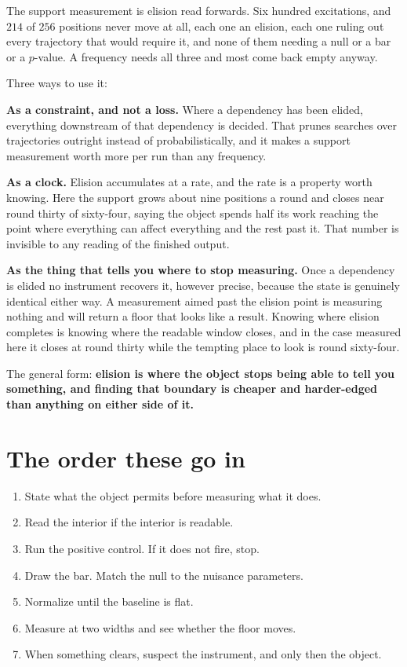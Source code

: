 The support measurement is elision read forwards. Six hundred excitations, and \(214\) of \(256\) positions never move at all, each one an elision, each one ruling out every trajectory that would require it, and none of them needing a null or a bar or a \(p\)-value. A frequency needs all three and most come back empty anyway.

Three ways to use it:

\textbf{As a constraint, and not a loss.} Where a dependency has been elided, everything downstream of that dependency is decided. That prunes searches over trajectories outright instead of probabilistically, and it makes a support measurement worth more per run than any frequency.

\textbf{As a clock.} Elision accumulates at a rate, and the rate is a property worth knowing. Here the support grows about nine positions a round and closes near round thirty of sixty-four, saying the object spends half its work reaching the point where everything can affect everything and the rest past it. That number is invisible to any reading of the finished output.

\textbf{As the thing that tells you where to stop measuring.} Once a dependency is elided no instrument recovers it, however precise, because the state is genuinely identical either way. A measurement aimed past the elision point is measuring nothing and will return a floor that looks like a result. Knowing where elision completes is knowing where the readable window closes, and in the case measured here it closes at round thirty while the tempting place to look is round sixty-four.

The general form: \textbf{elision is where the object stops being able to tell you something, and finding that boundary is cheaper and harder-edged than anything on either side of it.}

\section{The order these go in}

\begin{enumerate}
  \item State what the object permits before measuring what it does.
  \item Read the interior if the interior is readable.
  \item Run the positive control. If it does not fire, stop.
  \item Draw the bar. Match the null to the nuisance parameters.
  \item Normalize until the baseline is flat.
  \item Measure at two widths and see whether the floor moves.
  \item When something clears, suspect the instrument, and only then the object.
\end{enumerate}
